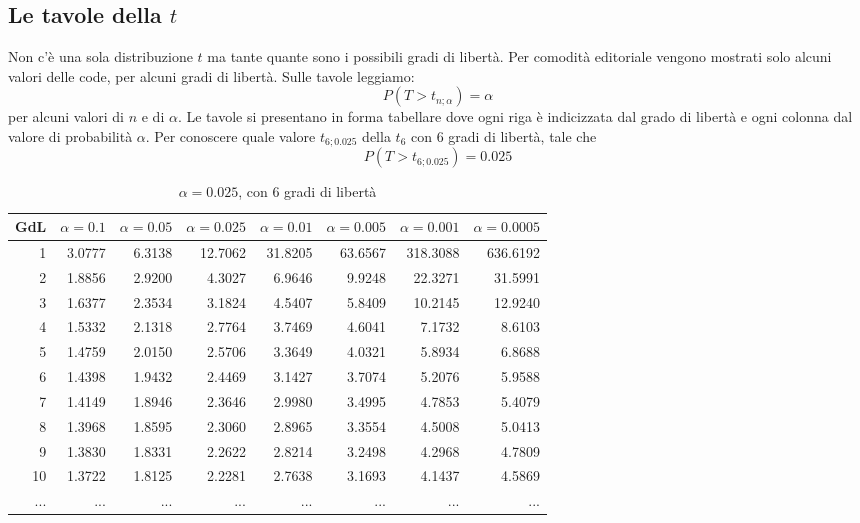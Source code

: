 \documentclass[
  11pt,
]{book}
\theoremstyle{mytheoremstyle}
\theoremstyle{mydefstyle}
\begin{document}
\subsection{\texorpdfstring{Le tavole della \(t\)}{Le tavole della t}}\label{le-tavole-della-t}

Non c'è una sola distribuzione \(t\) ma tante quante sono i possibili gradi di libertà.
Per comodità editoriale vengono mostrati solo alcuni valori delle code, per alcuni gradi di libertà.
Sulle tavole leggiamo:
\[
P(T>t_{n;\alpha})=\alpha
\]
per alcuni valori di \(n\) e di \(\alpha\).
Le tavole si presentano in forma tabellare dove ogni riga è indicizzata dal grado di libertà e ogni colonna dal valore di probabilità \(\alpha\).
Per conoscere quale valore \(t_{6;0.025}\) della \(t_6\) con 6 gradi di libertà, tale che
\[
P(T>t_{6;0.025})=0.025
\]

\begin{table}
\centering
\caption{\label{tab:09-Statistiche-Campionarie-5} $\alpha=0.025$, con 6 gradi di libertà}
\centering
\fontsize{7}{9}\selectfont
\begin{tabular}[t]{rrr|>{}r|rrrr}
\toprule
GdL & $\alpha=0.1$ & $\alpha=0.05$ & $\alpha=0.025$ & $\alpha=0.01$ & $\alpha=0.005$ & $\alpha=0.001$ & $\alpha=0.0005$\\
\midrule
1 & 3.0777 & 6.3138 & \textcolor[HTML]{AB292E}{12.7062} & 31.8205 & 63.6567 & 318.3088 & 636.6192\\
2 & 1.8856 & 2.9200 & \textcolor[HTML]{AB292E}{4.3027} & 6.9646 & 9.9248 & 22.3271 & 31.5991\\
3 & 1.6377 & 2.3534 & \textcolor[HTML]{AB292E}{3.1824} & 4.5407 & 5.8409 & 10.2145 & 12.9240\\
4 & 1.5332 & 2.1318 & \textcolor[HTML]{AB292E}{2.7764} & 3.7469 & 4.6041 & 7.1732 & 8.6103\\
5 & 1.4759 & 2.0150 & \textcolor[HTML]{AB292E}{2.5706} & 3.3649 & 4.0321 & 5.8934 & 6.8688\\
\midrule
\textcolor[HTML]{AB292E}{6} & \textcolor[HTML]{AB292E}{1.4398} & \textcolor[HTML]{AB292E}{1.9432} & \textcolor[HTML]{AB292E}{2.4469} & \textcolor[HTML]{AB292E}{3.1427} & \textcolor[HTML]{AB292E}{3.7074} & \textcolor[HTML]{AB292E}{5.2076} & \textcolor[HTML]{AB292E}{5.9588}\\
\midrule
7 & 1.4149 & 1.8946 & \textcolor[HTML]{AB292E}{2.3646} & 2.9980 & 3.4995 & 4.7853 & 5.4079\\
8 & 1.3968 & 1.8595 & \textcolor[HTML]{AB292E}{2.3060} & 2.8965 & 3.3554 & 4.5008 & 5.0413\\
9 & 1.3830 & 1.8331 & \textcolor[HTML]{AB292E}{2.2622} & 2.8214 & 3.2498 & 4.2968 & 4.7809\\
10 & 1.3722 & 1.8125 & \textcolor[HTML]{AB292E}{2.2281} & 2.7638 & 3.1693 & 4.1437 & 4.5869\\
... & ... & ... & \textcolor[HTML]{AB292E}{...} & ... & ... & ... & ...\\
\bottomrule
\end{tabular}
\end{table}
\end{document}
